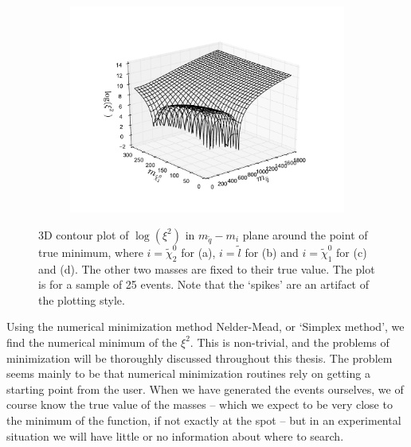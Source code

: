 \documentclass[twoside,english]{uiofysmaster}
\begin{document}
\begin{figure}[hbt]
	\begin{subfigure}[b]{0.49\textwidth}
		\includegraphics[width=\textwidth]{figures/3D_plot_xisquared_1_simplistic_event_squark-chi1.pdf} 
		\caption{}
	\end{subfigure}
	\caption{3D contour plot of $\log(\xi^2)$ in $m_{\tilde q}-m_i$ plane around the point of true minimum, where $i=\tilde \chi_2^0$ for (a), $i=\tilde l$ for (b) and $i=\tilde \chi_1^0$ for (c) and (d). The other two masses are fixed to their true value. The plot is for a sample of 25 events. Note that the `spikes' are an artifact of the plotting style.}
	\label{fig:3D_masses_simplistic_1event}
\end{figure}

Using the numerical minimization method Nelder-Mead, or `Simplex method', we find the numerical minimum of the $\xi^2$. This is non-trivial, and the problems of minimization will be thoroughly discussed throughout this thesis. The problem seems mainly to be that numerical minimization routines rely on getting a starting point from the user. When we have generated the events ourselves, we of course know the true value of the masses -- which we expect to be very close to the minimum of the function, if not exactly at the spot -- but in an experimental situation we will have little or no information about where to search. 
\end{document}

